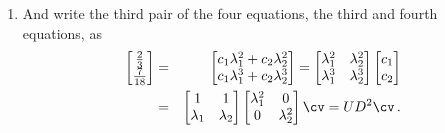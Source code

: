 \begin{draft}
\begin{example}
\begin{solution}
\begin{enumerate}
\begin{enumerate}
\item And write the third pair of the four equations, the third and fourth equations, as
\begin{eqnarray*}
\begin{bmatrix} \frac23\\\frac7{18} \end{bmatrix}
&=&\begin{bmatrix} c_1\lambda_1^2+c_2\lambda_2^2\\ c_1\lambda_1^3+c_2\lambda_2^3\end{bmatrix}
=\begin{bmatrix} \lambda_1^2&\lambda_2^2\\\lambda_1^3&\lambda_2^3 \end{bmatrix}\begin{bmatrix} c_1\\c_2 \end{bmatrix}
\\&=&\begin{bmatrix} 1&1\\\lambda_1&\lambda_2 \end{bmatrix}
\begin{bmatrix} \lambda_1^2&0\\0&\lambda_2^2 \end{bmatrix}\cv
=UD^2\cv\,.
\end{eqnarray*}
\end{enumerate}


\end{enumerate}
\end{solution}
\end{example}
\end{draft}
